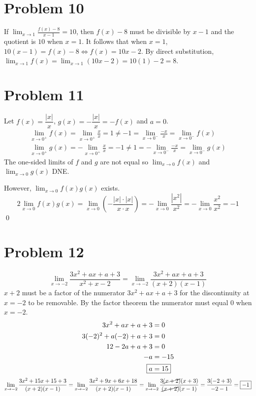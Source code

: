 \documentclass{article}
\newcommand{\paren}[1]{\left(#1\right)}
\newcommand{\problem}[1]{\section*{Problem #1}}
\begin{document}
\problem{10}
If $\displaystyle \lim_{x\to1}\frac{f(x)-8}{x-1}=10$, then $f(x)-8$ must be divisible by $x-1$ and the quotient is $10$ when $x=1$. It follows that when $x=1$, $10(x-1)=f(x)-8\iff f(x)=10x-2$. By direct substitution, $\displaystyle\lim_{x\to1}f(x)=\lim_{x\to1}(10x-2)=10(1)-2=\boxed{8}$.

\problem{11}
Let $f(x)=\dfrac{|x|}{x}$, $g(x)=-\dfrac{|x|}{x}=-f(x)$ and $a=0$.
\begin{gather*}
	\lim_{x\to0^+}f(x)=\lim_{x\to0^+}\frac{x}{x}=1\neq-1=\lim_{x\to0^-}\frac{-x}{x}=\lim_{x\to0^-}f(x) \\
	\lim_{x\to0^+}g(x)=-\lim_{x\to0^+}\frac{x}{x}=-1\neq1=-\lim_{x\to0^-}\frac{-x}{x}=\lim_{x\to0^-}g(x)
\end{gather*}
The one-sided limits of $f$ and $g$ are not equal so $\displaystyle\lim_{x\to0}f(x)$ and $\displaystyle\lim_{x\to0}g(x)$ DNE.

However, $\displaystyle\lim_{x\to0}f(x)g(x)$ exists.
\begin{equation*}{2}
	\lim_{x\to0}f(x)g(x)=\lim_{x\to0}\paren{-\frac{|x|\cdot|x|}{x\cdot x}}=-\lim_{x\to0}\frac{|x^2|}{x^2}=-\lim_{x\to0}\frac{x^2}{x^2}=-1
\end{equation*}
\qed

\vspace*{-10pt}
\problem{12}
\begin{equation*}
	\lim_{x\to-2}\frac{3x^2+ax+a+3}{x^2+x-2}
	=\lim_{x\to-2}\frac{3x^2+ax+a+3}{(x+2)(x-1)}
\end{equation*}
$x+2$ must be a factor of the numerator $3x^2+ax+a+3$ for the discontinuity at $x=-2$ to be removable. By the factor theorem the numerator must equal $0$ when $x=-2$.
\begin{align*}
	3x^2+ax+a+3&=0 \\
	3(-2)^2+a(-2)+a+3&=0 \\
	12-2a+a+3&=0 \\
	-a&=-15 \\
	\Aboxed{a&=15}
\end{align*}
\begin{equation*}
	\lim_{x\to-2}\frac{3x^2+15x+15+3}{(x+2)(x-1)}
	=\lim_{x\to-2}\frac{3x^2+9x+6x+18}{(x+2)(x-1)}
	=\lim_{x\to-2}\frac{3\cancel{(x+2)}(x+3)}{\cancel{(x+2)}(x-1)}
	=\frac{3(-2+3)}{-2-1}=\boxed{-1}
\end{equation*}
\end{document}
